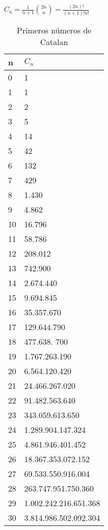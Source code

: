 
{\LARGE $C_{n} = \frac{1}{n+1}\binom{2n}{n} = \frac{(2n)!}{(n+1)!n!}$}

\begin{table}[htb]
\begin{tabular}{|l|l|}
\hline
n & $C_{n}$ \\ \hline
0 & 1 \\ \hline
1 & 1 \\ \hline
2 & 2 \\ \hline
3 & 5 \\ \hline
4 & 14 \\ \hline
5 & 42 \\ \hline
6 & 132 \\ \hline
7 & 429 \\ \hline
8 & 1.430\\ \hline
9 & 4.862\\ \hline
10 & 16.796\\ \hline
11 & 58.786\\ \hline
12 & 208.012\\ \hline
13 & 742.900\\ \hline
14 & 2.674.440\\ \hline
15 & 9.694.845\\ \hline
16 & 35.357.670\\ \hline
17 & 129.644.790\\ \hline
18 & 477.638. 700\\ \hline
19 & 1.767.263.190\\ \hline
20 & 6.564.120.420\\ \hline
21 & 24.466.267.020\\ \hline
22 & 91.482.563.640\\ \hline
23 & 343.059.613.650\\ \hline
24 & 1.289.904.147.324\\ \hline
25 & 4.861.946.401.452\\ \hline
26 & 18.367.353.072.152\\ \hline
27 & 69.533.550.916.004\\ \hline
28 & 263.747.951.750.360\\ \hline
29 & 1.002.242.216.651.368\\ \hline
30 & 3.814.986.502.092.304\\ \hline
\end{tabular}
\caption{Primeros n\'umeros de Catalan}
\end{table}

